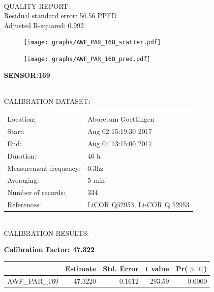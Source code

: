 \documentclass[oneside]{report}
\begin{document}
\hrulefill\\
QUALITY REPORT:\\
Residual standard error: 56.56 PPFD\\
Adjusted R-squared: 0.992



\begin{figure}[H]
  \centering
  \texttt{[image: graphs/AWF\_PAR\_168\_scatter.pdf]}
\end{figure}




\begin{figure}[H]
  \centering
  \texttt{[image: graphs/AWF\_PAR\_168\_pred.pdf]}
\end{figure}

\pagebreak


\begin{center}
\large{\textbf{SENSOR:169}}\\
\end{center}

\hrulefill\\
CALIBRATION DATASET:\\
\begin{table}[h!]
  \centering
  \label{tab:table1}
  \begin{tabular}{ll}
    Location: & Aboretum Goettingen\\ 
    
    
    Start:  & Aug 02 15:19:30 2017 \\
    End:   & Aug 04 13:15:00 2017\\ 
    Duration: & 46 h\\
    Measurement frequency: & 0.3hz\\
    Averaging:  &5 min\\
    Number of records: & 334 \\
    References: & LiCOR Q52953, Li-COR Q 52953 \\
  \end{tabular}
\end{table}

\hrulefill\\
CALIBRATION RESULTS:\\


\begin{center}
\textbf{\large{Calibration Factor: 47.322}}\\
\end{center}
\begin{table}[ht]
\centering
\begin{tabular}{rrrrr}
  \hline
 & Estimate & Std. Error & t value & Pr($>$$|$t$|$) \\ 
  \hline
AWF\_PAR\_169 & 47.3220 & 0.1612 & 293.59 & 0.0000 \\ 
   \hline
\end{tabular}
\end{table}
\end{document}
